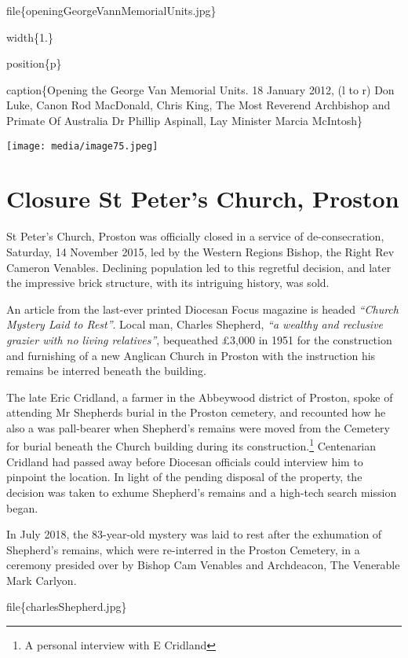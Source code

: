 file\{openingGeorgeVannMemorialUnits.jpg\}

width\{1.\}

position\{p\}

caption\{Opening the George Van Memorial Units. 18 January 2012, (l to r) Don Luke, Canon Rod MacDonald, Chris King, The Most Reverend Archbishop and Primate Of Australia Dr Phillip Aspinall, Lay Minister Marcia McIntosh\}

\texttt{[image: media/image75.jpeg]}

\hypertarget{closure-st-peters-church-proston}{%
\section{Closure St Peter's Church, Proston}\label{closure-st-peters-church-proston}}

St Peter's Church, Proston was officially closed in a service of de-consecration, Saturday, 14 November 2015, led by the Western Regions Bishop, the Right Rev Cameron Venables. Declining population led to this regretful decision, and later the impressive brick structure, with its intriguing history, was sold.

An article from the last-ever printed Diocesan Focus magazine is headed \emph{``Church Mystery Laid to Rest''}. Local man, Charles Shepherd, \emph{``a wealthy and reclusive grazier with no living relatives''}, bequeathed £3,000 in 1951 for the construction and furnishing of a new Anglican Church in Proston with the instruction his remains be interred beneath the building.

The late Eric Cridland, a farmer in the Abbeywood district of Proston, spoke of attending Mr Shepherds burial in the Proston cemetery, and recounted how he also a was pall-bearer when Shepherd's remains were moved from the Cemetery for burial beneath the Church building during its construction.\footnote{A personal interview with E Cridland} Centenarian Cridland had passed away before Diocesan officials could interview him to pinpoint the location. In light of the pending disposal of the property, the decision was taken to exhume Shepherd's remains and a high-tech search mission began.

In July 2018, the 83-year-old mystery was laid to rest after the exhumation of Shepherd's remains, which were re-interred in the Proston Cemetery, in a ceremony presided over by Bishop Cam Venables and Archdeacon, The Venerable Mark Carlyon.

file\{charlesShepherd.jpg\}

